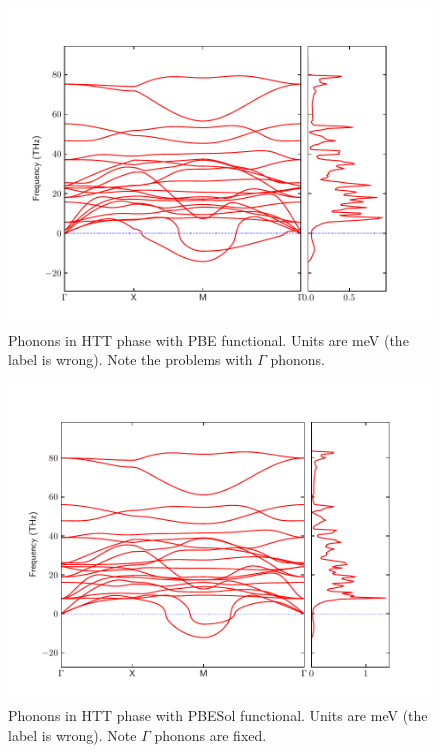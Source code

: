 \begin{figure}
    \centering
    \includegraphics[width=\textwidth]{fig/simulation/band_dos_htt_pe.pdf}
    \caption[HTT Phonons (PBE)]{Phonons in HTT phase with PBE functional. Units are meV (the label is wrong). Note the problems with $\Gamma$ phonons.}
    \label{fig:htt_pe}
\end{figure}

\begin{figure}
    \centering
    \includegraphics[width=\textwidth]{fig/simulation/band_dos_htt_ps.pdf}
    \caption[HTT Phonons (PBESol)]{Phonons in HTT phase with PBESol functional. Units are meV (the label is wrong). Note $\Gamma$ phonons are fixed.}
    \label{fig:htt_ps}
\end{figure}

